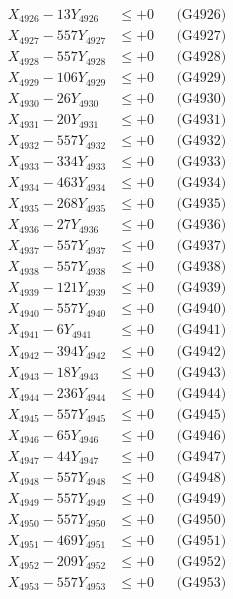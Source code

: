 \documentclass[a4paper,10pt]{article}
\begin{document}
{\begin{align}
X_{4926} - 13Y_{4926} &\leq +0 && \text{(G4926)} \\
X_{4927} - 557Y_{4927} &\leq +0 && \text{(G4927)} \\
X_{4928} - 557Y_{4928} &\leq +0 && \text{(G4928)} \\
X_{4929} - 106Y_{4929} &\leq +0 && \text{(G4929)} \\
X_{4930} - 26Y_{4930} &\leq +0 && \text{(G4930)} \\
\allowbreak
X_{4931} - 20Y_{4931} &\leq +0 && \text{(G4931)} \\
X_{4932} - 557Y_{4932} &\leq +0 && \text{(G4932)} \\
X_{4933} - 334Y_{4933} &\leq +0 && \text{(G4933)} \\
X_{4934} - 463Y_{4934} &\leq +0 && \text{(G4934)} \\
X_{4935} - 268Y_{4935} &\leq +0 && \text{(G4935)} \\
X_{4936} - 27Y_{4936} &\leq +0 && \text{(G4936)} \\
X_{4937} - 557Y_{4937} &\leq +0 && \text{(G4937)} \\
X_{4938} - 557Y_{4938} &\leq +0 && \text{(G4938)} \\
X_{4939} - 121Y_{4939} &\leq +0 && \text{(G4939)} \\
X_{4940} - 557Y_{4940} &\leq +0 && \text{(G4940)} \\
\allowbreak
X_{4941} - 6Y_{4941} &\leq +0 && \text{(G4941)} \\
X_{4942} - 394Y_{4942} &\leq +0 && \text{(G4942)} \\
X_{4943} - 18Y_{4943} &\leq +0 && \text{(G4943)} \\
X_{4944} - 236Y_{4944} &\leq +0 && \text{(G4944)} \\
X_{4945} - 557Y_{4945} &\leq +0 && \text{(G4945)} \\
X_{4946} - 65Y_{4946} &\leq +0 && \text{(G4946)} \\
X_{4947} - 44Y_{4947} &\leq +0 && \text{(G4947)} \\
X_{4948} - 557Y_{4948} &\leq +0 && \text{(G4948)} \\
X_{4949} - 557Y_{4949} &\leq +0 && \text{(G4949)} \\
X_{4950} - 557Y_{4950} &\leq +0 && \text{(G4950)} \\
\allowbreak
X_{4951} - 469Y_{4951} &\leq +0 && \text{(G4951)} \\
X_{4952} - 209Y_{4952} &\leq +0 && \text{(G4952)} \\
X_{4953} - 557Y_{4953} &\leq +0 && \text{(G4953)} \\

\end{align}}
\end{document}
